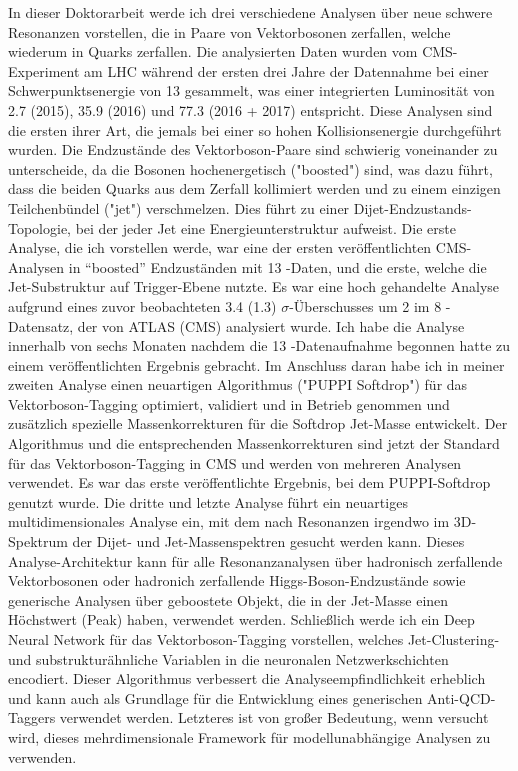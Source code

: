 \small
\noindent In dieser Doktorarbeit werde ich drei verschiedene Analysen über neue schwere Resonanzen vorstellen, die in Paare von Vektorbosonen zerfallen, welche wiederum in Quarks zerfallen. Die analysierten Daten wurden vom CMS-Experiment am LHC während der ersten drei Jahre der Datennahme bei einer Schwerpunktsenergie von 13 \TeV gesammelt, was einer integrierten Luminosität von 2.7 (2015), 35.9 (2016) und 77.3 (2016 + 2017) \fbinv entspricht. Diese Analysen sind die ersten ihrer Art, die jemals bei einer so hohen Kollisionsenergie durchgeführt wurden. Die Endzustände des Vektorboson-Paare sind schwierig voneinander zu unterscheide, da die Bosonen hochenergetisch ("boosted") sind, was dazu führt, dass die beiden Quarks aus dem Zerfall kollimiert werden und zu einem einzigen Teilchenbündel ("jet") verschmelzen. Dies führt zu einer Dijet-Endzustands-Topologie, bei der jeder Jet eine Energieunterstruktur aufweist. Die erste Analyse, die ich vorstellen werde, war eine der ersten veröffentlichten CMS-Analysen in “boosted” Endzuständen mit 13 \TeV-Daten, und die erste, welche die Jet-Substruktur auf Trigger-Ebene nutzte. Es war eine hoch gehandelte Analyse aufgrund eines zuvor beobachteten 3.4 (1.3) $\sigma$-Überschusses um 2 \TeV im 8 \TeV-Datensatz, der von ATLAS (CMS) analysiert wurde. Ich habe die Analyse innerhalb von sechs Monaten nachdem die 13 \TeV-Datenaufnahme begonnen hatte zu einem veröffentlichten Ergebnis gebracht. Im Anschluss daran habe ich in meiner zweiten Analyse einen neuartigen Algorithmus ("PUPPI Softdrop") für das Vektorboson-Tagging optimiert, validiert und in Betrieb genommen und zusätzlich spezielle Massenkorrekturen für die Softdrop Jet-Masse entwickelt. Der Algorithmus und die entsprechenden Massenkorrekturen sind jetzt der Standard für das Vektorboson-Tagging in CMS und werden von mehreren Analysen verwendet. Es war das erste veröffentlichte Ergebnis, bei dem PUPPI-Softdrop genutzt wurde. Die dritte und letzte Analyse führt ein neuartiges multidimensionales Analyse ein, mit dem nach Resonanzen irgendwo im 3D-Spektrum der Dijet- und Jet-Massenspektren gesucht werden kann. Dieses Analyse-Architektur kann für alle Resonanzanalysen über hadronisch zerfallende Vektorbosonen oder hadronich zerfallende Higgs-Boson-Endzustände sowie generische Analysen über geboostete Objekt, die in der Jet-Masse einen Höchstwert (Peak) haben, verwendet werden. 
Schließlich werde ich ein Deep Neural Network für das Vektorboson-Tagging vorstellen, welches Jet-Clustering- und substrukturähnliche Variablen in die neuronalen Netzwerkschichten encodiert. Dieser Algorithmus verbessert die Analyseempfindlichkeit erheblich und kann auch als Grundlage für die Entwicklung eines generischen Anti-QCD-Taggers verwendet werden. Letzteres ist von großer Bedeutung, wenn versucht wird, dieses mehrdimensionale Framework für modellunabhängige Analysen zu verwenden.
